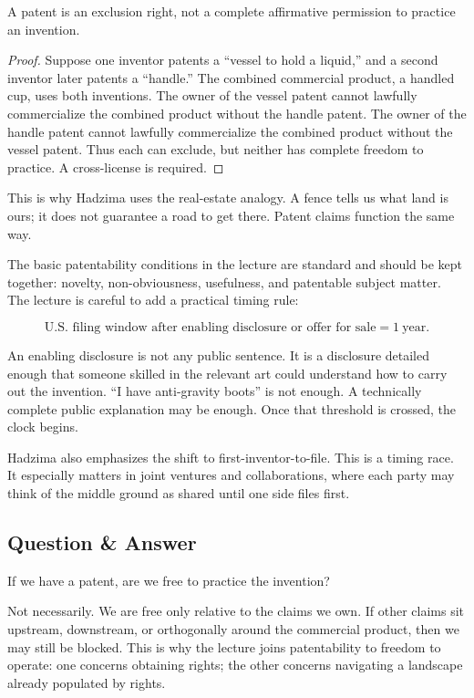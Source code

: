 \begin{proposition}
A patent is an exclusion right, not a complete affirmative permission to practice an invention.
\end{proposition}

\begin{proof}
Suppose one inventor patents a ``vessel to hold a liquid,'' and a second inventor later patents a ``handle.'' The combined commercial product, a handled cup, uses both inventions. The owner of the vessel patent cannot lawfully commercialize the combined product without the handle patent. The owner of the handle patent cannot lawfully commercialize the combined product without the vessel patent. Thus each can exclude, but neither has complete freedom to practice. A cross-license is required.
\end{proof}

This is why Hadzima uses the real-estate analogy. A fence tells us what land is ours; it does not guarantee a road to get there. Patent claims function the same way.

The basic patentability conditions in the lecture are standard and should be kept together: novelty, non-obviousness, usefulness, and patentable subject matter. The lecture is careful to add a practical timing rule:

\begin{equation}
\text{U.S. filing window after enabling disclosure or offer for sale} = 1\ \text{year}.
\end{equation}

An enabling disclosure is not any public sentence. It is a disclosure detailed enough that someone skilled in the relevant art could understand how to carry out the invention. ``I have anti-gravity boots'' is not enough. A technically complete public explanation may be enough. Once that threshold is crossed, the clock begins.

Hadzima also emphasizes the shift to first-inventor-to-file. This is a timing race. It especially matters in joint ventures and collaborations, where each party may think of the middle ground as shared until one side files first.

\subsection{Question \& Answer}

If we have a patent, are we free to practice the invention?

Not necessarily. We are free only relative to the claims we own. If other claims sit upstream, downstream, or orthogonally around the commercial product, then we may still be blocked. This is why the lecture joins patentability to freedom to operate: one concerns obtaining rights; the other concerns navigating a landscape already populated by rights.

